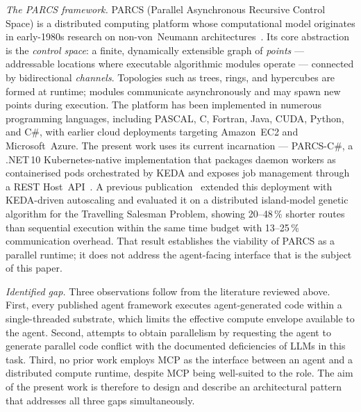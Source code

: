 \textit{The PARCS framework.}\quad
PARCS (Parallel Asynchronous Recursive Control Space) is a distributed computing platform whose computational model originates in early-1980s research on non-von~Neumann architectures~\cite{anisimov2017parcs}. Its core abstraction is the \textit{control space}: a finite, dynamically extensible graph of \textit{points} --- addressable locations where executable algorithmic modules operate --- connected by bidirectional \textit{channels}. Topologies such as trees, rings, and hypercubes are formed at runtime; modules communicate asynchronously and may spawn new points during execution. The platform has been implemented in numerous programming languages, including PASCAL, C, Fortran, Java, CUDA, Python, and C\#, with earlier cloud deployments targeting Amazon~EC2 and Microsoft~Azure. The present work uses its current incarnation --- PARCS-C\#, a .NET\,10 Kubernetes-native implementation that packages daemon workers as containerised pods orchestrated by KEDA and exposes job management through a REST Host~API~\cite{bohusevych2026parcs}. A previous publication~\cite{bohusevych2024tsp} extended this deployment with KEDA-driven autoscaling and evaluated it on a distributed island-model genetic algorithm for the Travelling Salesman Problem, showing 20--48\,\% shorter routes than sequential execution within the same time budget with 13--25\,\% communication overhead. That result establishes the viability of PARCS as a parallel runtime; it does not address the agent-facing interface that is the subject of this paper.

\textit{Identified gap.}\quad
Three observations follow from the literature reviewed above. First, every published agent framework executes agent-generated code within a single-threaded substrate, which limits the effective compute envelope available to the agent. Second, attempts to obtain parallelism by requesting the agent to generate parallel code conflict with the documented deficiencies of LLMs in this task. Third, no prior work employs MCP as the interface between an agent and a distributed compute runtime, despite MCP being well-suited to the role. The aim of the present work is therefore to design and describe an architectural pattern that addresses all three gaps simultaneously.
